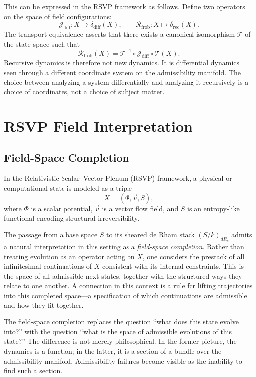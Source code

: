 \documentclass[12pt]{article}
\begin{document}
This can be expressed in the RSVP framework as follows. Define two operators on the
space of field configurations:
\[
\mathcal{J}_{\mathrm{diff}} : X \mapsto \delta_{\mathrm{diff}}(X),
\qquad
\mathcal{R}_{\mathrm{frob}} : X \mapsto \delta_{\mathrm{rec}}(X).
\]
The transport equivalence asserts that there exists a canonical isomorphism
$\mathcal{T}$ of the state-space such that
\[
\mathcal{R}_{\mathrm{frob}}(X) = \mathcal{T}^{-1} \circ \mathcal{J}_{\mathrm{diff}} \circ \mathcal{T}(X).
\]
Recursive dynamics is therefore not new dynamics. It is differential dynamics seen
through a different coordinate system on the admissibility manifold. The choice between
analyzing a system differentially and analyzing it recursively is a choice of
coordinates, not a choice of subject matter.

\section{RSVP Field Interpretation}

\subsection{Field-Space Completion}

In the Relativistic Scalar--Vector Plenum (RSVP) framework, a physical or
computational state is modeled as a triple
\[
X = (\Phi, \vec{v}, S),
\]
where $\Phi$ is a scalar potential, $\vec{v}$ is a vector flow field, and $S$ is an
entropy-like functional encoding structural irreversibility.

The passage from a base space $S$ to its sheared de Rham stack $(S/k)_{dR_c}$ admits a
natural interpretation in this setting as a \emph{field-space completion}. Rather than
treating evolution as an operator acting on $X$, one considers the prestack of all
infinitesimal continuations of $X$ consistent with its internal constraints. This is
the space of all admissible next states, together with the structured ways they relate
to one another. A connection in this context is a rule for lifting trajectories into
this completed space---a specification of which continuations are admissible and how
they fit together.

The field-space completion replaces the question ``what does this state evolve into?''
with the question ``what is the space of admissible evolutions of this state?'' The
difference is not merely philosophical. In the former picture, the dynamics is a
function; in the latter, it is a section of a bundle over the admissibility manifold.
Admissibility failures become visible as the inability to find such a section.
\end{document}
